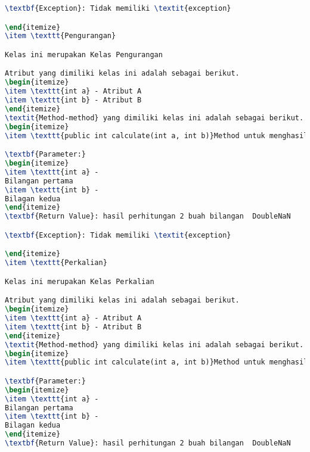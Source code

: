 \begin{lstlisting}[language=TeX, caption=Hasil pengujian kode program sederhana]
\textbf{Exception}: Tidak memiliki \textit{exception}

\end{itemize}
\item \texttt{Pengurangan}

Kelas ini merupakan Kelas Pengurangan

Atribut yang dimiliki kelas ini adalah sebagai berikut.
\begin{itemize}
\item \texttt{int a} - Atribut A
\item \texttt{int b} - Atribut B
\end{itemize}
\textit{Method-method} yang dimiliki kelas ini adalah sebagai berikut.
\begin{itemize}
\item \texttt{public int calculate(int a, int b)}Method untuk menghasilkan perhitungan 2 buah bilangan

\textbf{Parameter:}
\begin{itemize}
\item \texttt{int a} - 
Bilangan pertama
\item \texttt{int b} - 
Bilagan kedua
\end{itemize}
\textbf{Return Value}: hasil perhitungan 2 buah bilangan  DoubleNaN

\textbf{Exception}: Tidak memiliki \textit{exception}

\end{itemize}
\item \texttt{Perkalian}

Kelas ini merupakan Kelas Perkalian

Atribut yang dimiliki kelas ini adalah sebagai berikut.
\begin{itemize}
\item \texttt{int a} - Atribut A
\item \texttt{int b} - Atribut B
\end{itemize}
\textit{Method-method} yang dimiliki kelas ini adalah sebagai berikut.
\begin{itemize}
\item \texttt{public int calculate(int a, int b)}Method untuk menghasilkan perhitungan 2 buah bilangan

\textbf{Parameter:}
\begin{itemize}
\item \texttt{int a} - 
Bilangan pertama
\item \texttt{int b} - 
Bilagan kedua
\end{itemize}
\textbf{Return Value}: hasil perhitungan 2 buah bilangan  DoubleNaN


\end{lstlisting}
